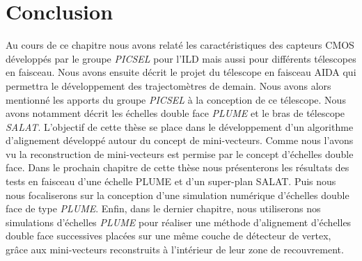   \section{Conclusion}
  
  Au cours de ce chapitre nous avons relat\'e les caract\'eristiques des capteurs CMOS d\'evelopp\'es par le groupe \textit{PICSEL} pour l'ILD mais aussi pour diff\'erents t\'elescopes en faisceau. Nous avons ensuite d\'ecrit le projet du télescope en faisceau AIDA qui permettra le développement des trajectom\`etres de demain. Nous avons alors mentionn\'e les apports du groupe \textit{PICSEL} \`a la conception de ce t\'elescope. Nous avons notamment d\'ecrit les \'echelles double face \textit{PLUME} et le bras de t\'elescope \textit{SALAT}. L'objectif de cette th\`ese se place dans le d\'eveloppement d'un algorithme d'alignement d\'eveloppé autour du concept de mini-vecteurs. Comme nous l'avons vu la reconstruction de mini-vecteurs est permise par le concept d'\'echelles double face. Dans le prochain chapitre de cette th\`ese nous pr\'esenterons les r\'esultats des tests en faisceau d'une \'echelle PLUME et d'un super-plan SALAT. Puis nous nous focaliserons sur la conception d'une simulation num\'erique d'\'echelles double face de type \textit{PLUME}. Enfin, dans le dernier chapitre, nous utiliserons nos simulations d'\'echelles \textit{PLUME} pour r\'ealiser une m\'ethode d'alignement d'\'echelles double face successives plac\'ees sur une m\^eme couche de d\'etecteur de vertex, gr\^ace aux mini-vecteurs reconstruits \`a l'int\'erieur de leur zone de recouvrement.
